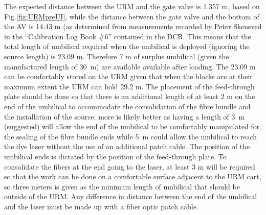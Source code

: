 \documentclass[11pt]{article}
\begin{document}
The expected distance between the URM and the gate valve is 1.357 m,
based on Fig.\ref{fig:URMpreUI}, while the distance between the gate
valve and the bottom of the AV is 14.43 m (as determined from
measurements recorded by Peter Skensved in the ``Calibration Log Book
\#6'' contained in the DCR. This means that the total length of
umbilical required when the umbilical is deployed (ignoring the source
length) is 23.09 m. Therefore 7 m of surplus umbilical (given the
manufactured length of 30~m) are available available after
loading. The 23.09 m can be comfortably stored on the URM given that
when the blocks are at their maximum extent the URM can hold 29.2
m. The placement of the feed-through plate should be done so that
there is an additional length of at least 2 m on the end of the
umbilical to accommodate the consolidation of the fibre bundle and the
installation of the source; more is likely better as having a length
of 3~m (suggested) will allow the end of the umbilical to be
comfortably manipulated for the sealing of the fibre bundle ends while
5~m could allow the umbilical to reach the dye laser without the use
of an additional patch cable. The position of the umbilical ends is
dictated by the position of the feed-through plate. To consolidate the
fibers at the end going to the laser, at least 3 m will be required so
that the work can be done on a comfortable surface adjacent to the URM
cart, so three meters is given as the minimum length of umbilical that
should be outside of the URM. Any difference in distance between the
end of the umbilical and the laser must be made up with a fiber optic
patch cable.
\end{document}
